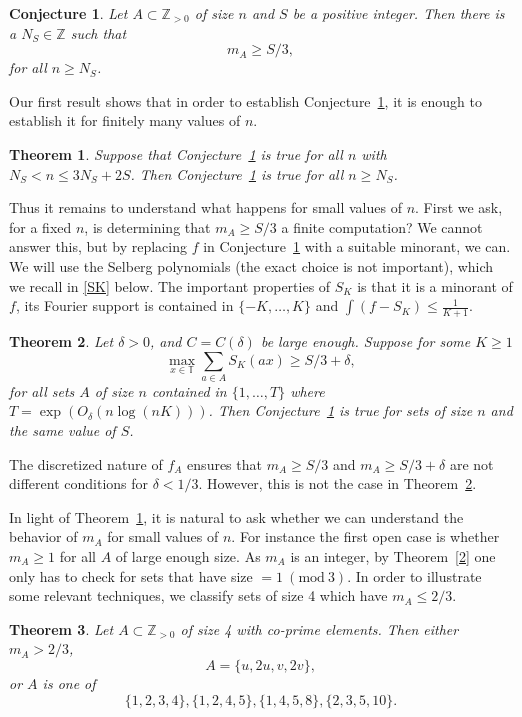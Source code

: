 \documentclass[12pt,reqno]{amsart}
\theoremstyle{dotless}
\newtheorem{thm}{Theorem}
\newtheorem{conj}{Conjecture}
\newcommand{\Mod}[1]{\ (\mathrm{mod}\ #1)}
\begin{document}
\begin{conj}\label{MC2} 
Let $A \subset \mathbb{Z}_{>0}$ of size $n$ and $S$ be a positive integer. Then there is a $N_S \in \mathbb{Z}$ such that
$$m_A \geq S/3,$$
for all $n \geq N_S$.  
\end{conj} 

Our first result shows that in order to establish Conjecture~\ref{MC2}, it is enough to establish it for finitely many values of $n$. 

\begin{thm}\label{main} 
Suppose that Conjecture~\ref{MC2} is true for all $n$ with $N_S <  n \leq 3N_S + 2S$. Then Conjecture~\ref{MC2} is true for all $n \geq N_S$. 
\end{thm}

Thus it remains to understand what happens for small values of $n$. First we ask, for a fixed $n$, is determining that $m_A \geq S/3$ a finite computation? We cannot answer this, but by replacing $f$ in Conjecture~\ref{MC2} with a suitable minorant, we can. We will use the Selberg polynomials (the exact choice is not important), which we recall in \eqref{SK} below. The important properties of $S_K$ is that it is a minorant of $f$, its Fourier support is contained in $\{-K , \ldots , K\}$ and $\int (f - S_K ) \leq \frac{1}{K+1}$. 

\begin{thm}\label{main2}
Let  $\delta >0$, and $C = C(\delta)$ be large enough. Suppose for some $K\geq 1$
$$\max_{x\in \mathbb{T}} \sum_{a\in A} S_K(ax) \geq S/3 + \delta,$$
for all sets $A$ of size $n$ contained in $\{1 , \ldots , T\}$ where $T = \exp(O_{\delta}(n\log (nK)))$. Then Conjecture~\ref{MC2} is true for sets of size $n$ and the same value of $S$.
\end{thm}

The discretized nature of $f_A$ ensures that $m_A \geq S/3$ and $m_A \geq S/3 + \delta$ are not different conditions for $\delta <1/3$. However, this is not the case in Theorem~\ref{main2}. 

In light of Theorem~\ref{main}, it is natural to ask whether we can understand the behavior of $m_A$ for small values of $n$. For instance the first open case is whether $m_A \geq 1$ for all $A$ of large enough size. As $m_A$ is an integer, by Theorem~\ref{2} one only has to check for sets that have size $= 1 \Mod 3$. In order to illustrate some relevant techniques, we classify sets of size 4 which have $m_A \leq 2/3$.

\begin{thm}\label{main4} Let $A \subset \mathbb{Z}_{>0}$ of size 4 with co-prime elements. Then either $m_A > 2/3$,
$$A = \{u , 2u , v , 2v\},$$
or $A$ is one of 
$$\{1,2,3,4\}, \{1,2,4,5\},\{1,4,5,8\}, \{2,3,5,10\}.$$
\end{thm}
\end{document}

